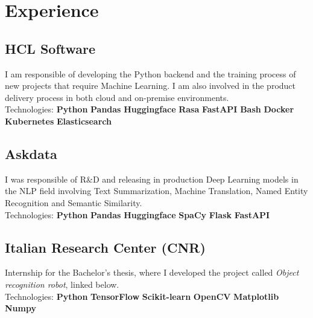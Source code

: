 \documentclass[]{deedy-resume-openfont}
\begin{document}
\begin{minipage}[t]{0.66\textwidth} 


\section{Experience}

\subsection{HCL Software}
I am responsible of developing the Python backend and the training process of new projects that require Machine Learning. I am also involved in the product delivery process in both cloud and on-premise environments. \\
Technologies: \textbf{Python} \textbullet{} \textbf{Pandas} \textbullet{} \textbf{Huggingface} \textbullet{} \textbf{Rasa} \textbullet{} \textbf{FastAPI} \textbullet{} \textbf{Bash} \textbullet{} \textbf{Docker} \textbullet{} \textbf{Kubernetes} \textbullet{} \textbf{Elasticsearch}
\sectionsep

\subsection{Askdata}
I was responsible of R\&D and releasing in production Deep Learning models in the NLP field involving Text Summarization, Machine Translation, Named Entity Recognition and Semantic Similarity. \\
Technologies: \textbf{Python} \textbullet{} \textbf{Pandas} \textbullet{} \textbf{Huggingface} \textbullet{} \textbf{SpaCy} \textbullet{} \textbf{Flask} \textbullet{} \textbf{FastAPI}
\sectionsep

\subsection{Italian Research Center (CNR)}
Internship for the Bachelor's thesis, where I developed the project called \textit{Object recognition robot}, linked below. \\
Technologies: \textbf{Python} \textbullet{} \textbf{TensorFlow} \textbullet{} \textbf{Scikit-learn} \textbullet{} \textbf{OpenCV} \textbullet{} \textbf{Matplotlib} \textbullet{} \textbf{Numpy}



\end{minipage}
\end{document}
